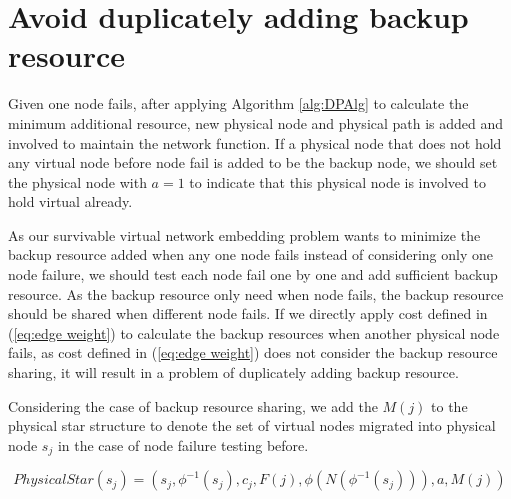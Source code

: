 
\section{Avoid  duplicately adding backup resource}


Given one node fails, after applying Algorithm \ref{alg:DPAlg} to calculate the minimum additional resource, new physical node and physical path is added and involved to maintain the network function. If a physical node that does not hold any virtual node before node fail is added to be the backup node, we should set the physical node with $a=1$ to indicate that this physical node is involved to hold virtual already.

As our survivable virtual network embedding problem wants to minimize the backup resource added when any one node fails instead of considering only one node failure, we should test each node fail one by one and add sufficient backup resource. As the backup resource only need when node fails,  the  backup resource  should be shared when different node fails. If we directly apply cost defined in (\ref{eq:edge weight}) to calculate the backup resources when another physical node fails, as cost defined in (\ref{eq:edge weight}) does not consider the backup resource sharing, it will result in a problem of duplicately adding backup resource.

Considering the case of backup resource sharing,  we add the  $M(j)$ to the physical star structure to denote the set of virtual nodes migrated into  physical node $s_j$ in the case of node failure testing before.


\begin{equation}
PhysicalStar(s_j)=(s_j, \phi^{-1}( s_j), c_j, F(j), \phi(N(\phi^{-1}( s_j))), a, M(j))
\end{equation}

